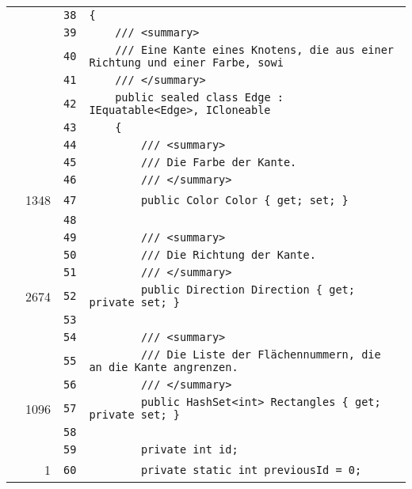 \documentclass[a4paper,10pt]{article}
\begin{document}
\begin{longtable}[l]{lrrl}
\cellcolor{gray} &  & \verb~38~ & \verb~{~\\
\cellcolor{gray} &  & \verb~39~ & \verb~    /// <summary>~\\
\cellcolor{gray} &  & \verb~40~ & \verb~    /// Eine Kante eines Knotens, die aus einer Richtung und einer Farbe, sowi~\\
\cellcolor{gray} &  & \verb~41~ & \verb~    /// </summary>~\\
\cellcolor{gray} &  & \verb~42~ & \verb~    public sealed class Edge : IEquatable<Edge>, ICloneable~\\
\cellcolor{gray} &  & \verb~43~ & \verb~    {~\\
\cellcolor{gray} &  & \verb~44~ & \verb~        /// <summary>~\\
\cellcolor{gray} &  & \verb~45~ & \verb~        /// Die Farbe der Kante.~\\
\cellcolor{gray} &  & \verb~46~ & \verb~        /// </summary>~\\
\cellcolor{green} & 1348 & \verb~47~ & \verb~        public Color Color { get; set; }~\\
\cellcolor{gray} &  & \verb~48~ & \verb~~\\
\cellcolor{gray} &  & \verb~49~ & \verb~        /// <summary>~\\
\cellcolor{gray} &  & \verb~50~ & \verb~        /// Die Richtung der Kante.~\\
\cellcolor{gray} &  & \verb~51~ & \verb~        /// </summary>~\\
\cellcolor{green} & 2674 & \verb~52~ & \verb~        public Direction Direction { get; private set; }~\\
\cellcolor{gray} &  & \verb~53~ & \verb~~\\
\cellcolor{gray} &  & \verb~54~ & \verb~        /// <summary>~\\
\cellcolor{gray} &  & \verb~55~ & \verb~        /// Die Liste der Flächennummern, die an die Kante angrenzen.~\\
\cellcolor{gray} &  & \verb~56~ & \verb~        /// </summary>~\\
\cellcolor{green} & 1096 & \verb~57~ & \verb~        public HashSet<int> Rectangles { get; private set; }~\\
\cellcolor{gray} &  & \verb~58~ & \verb~~\\
\cellcolor{gray} &  & \verb~59~ & \verb~        private int id;~\\
\cellcolor{green} & 1 & \verb~60~ & \verb~        private static int previousId = 0;~\\

\end{longtable}
\end{document}
